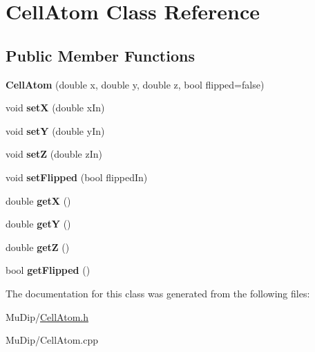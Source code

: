 \hypertarget{class_cell_atom}{}\section{Cell\+Atom Class Reference}
\label{class_cell_atom}
\subsection*{Public Member Functions}
\begin{DoxyCompactItemize}
\item 
\mbox{\label{class_cell_atom_a3e781f2e0f62944cdcdd8e047afe0118}} 
{\bfseries Cell\+Atom} (double x, double y, double z, bool flipped=false)
\item 
\mbox{\label{class_cell_atom_aa6d9dd7ae86a7104c6b82b171a99930c}} 
void {\bfseries setX} (double x\+In)
\item 
\mbox{\label{class_cell_atom_acd7ac967be7723f34fcb564dc1e4c60d}} 
void {\bfseries setY} (double y\+In)
\item 
\mbox{\label{class_cell_atom_a4e9f7f10547baff38df74f9b0ebb663b}} 
void {\bfseries setZ} (double z\+In)
\item 
\mbox{\label{class_cell_atom_a7e3d81b8055bb920ad6ac4d48db287bc}} 
void {\bfseries set\+Flipped} (bool flipped\+In)
\item 
\mbox{\label{class_cell_atom_a72e97bd46d56247d0c2fb8e2340abb9b}} 
double {\bfseries getX} ()
\item 
\mbox{\label{class_cell_atom_afb715abac28cc423032585acd416cf7d}} 
double {\bfseries getY} ()
\item 
\mbox{\label{class_cell_atom_ac280e8335425cd22172000fc4ad10104}} 
double {\bfseries getZ} ()
\item 
\mbox{\label{class_cell_atom_a112321767ed50a1f3ea084d55f8afa0e}} 
bool {\bfseries get\+Flipped} ()
\end{DoxyCompactItemize}


The documentation for this class was generated from the following files\+:\begin{DoxyCompactItemize}
\item 
Mu\+Dip/\mbox{\hyperlink{_cell_atom_8h}{Cell\+Atom.\+h}}\item 
Mu\+Dip/Cell\+Atom.\+cpp\end{DoxyCompactItemize}
